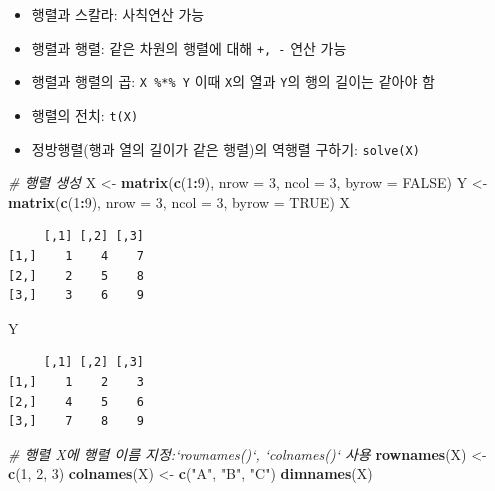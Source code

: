 \documentclass[11pt,a4paper]{book}
\newenvironment{Shaded}{\begin{snugshade}}{\end{snugshade}}
\newcommand{\KeywordTok}[1]{\textcolor[rgb]{0.13,0.29,0.53}{\textbf{#1}}}
\newcommand{\DataTypeTok}[1]{\textcolor[rgb]{0.13,0.29,0.53}{#1}}
\newcommand{\DecValTok}[1]{\textcolor[rgb]{0.00,0.00,0.81}{#1}}
\newcommand{\StringTok}[1]{\textcolor[rgb]{0.31,0.60,0.02}{#1}}
\newcommand{\CommentTok}[1]{\textcolor[rgb]{0.56,0.35,0.01}{\textit{#1}}}
\newcommand{\OtherTok}[1]{\textcolor[rgb]{0.56,0.35,0.01}{#1}}
\newcommand{\OperatorTok}[1]{\textcolor[rgb]{0.81,0.36,0.00}{\textbf{#1}}}
\newcommand{\NormalTok}[1]{#1}
\providecommand{\tightlist}{%
  \setlength{\itemsep}{0pt}\setlength{\parskip}{0pt}}
\theoremstyle{definition}
\theoremstyle{definition}
\theoremstyle{definition}
\theoremstyle{remark}
\begin{document}
\begin{itemize}
  \begin{itemize}
  \tightlist
  \item
    행렬과 스칼라: 사칙연산 가능
  \item
    행렬과 행렬: 같은 차원의 행렬에 대해 \texttt{+,\ -} 연산 가능
  \item
    행렬과 행렬의 곱: \texttt{X\ \%*\%\ Y} 이때 \texttt{X}의 열과
    \texttt{Y}의 행의 길이는 같아야 함
  \item
    행렬의 전치: \texttt{t(X)}
  \item
    정방행렬(행과 열의 길이가 같은 행렬)의 역행렬 구하기:
    \texttt{solve(X)}
  \end{itemize}
\end{itemize}

\footnotesize

\begin{Shaded}
\begin{Highlighting}[]
\CommentTok{# 행렬 생성}
\NormalTok{X <-}\StringTok{ }\KeywordTok{matrix}\NormalTok{(}\KeywordTok{c}\NormalTok{(}\DecValTok{1}\OperatorTok{:}\DecValTok{9}\NormalTok{), }\DataTypeTok{nrow =} \DecValTok{3}\NormalTok{, }\DataTypeTok{ncol =} \DecValTok{3}\NormalTok{, }\DataTypeTok{byrow =} \OtherTok{FALSE}\NormalTok{)}
\NormalTok{Y <-}\StringTok{ }\KeywordTok{matrix}\NormalTok{(}\KeywordTok{c}\NormalTok{(}\DecValTok{1}\OperatorTok{:}\DecValTok{9}\NormalTok{), }\DataTypeTok{nrow =} \DecValTok{3}\NormalTok{, }\DataTypeTok{ncol =} \DecValTok{3}\NormalTok{, }\DataTypeTok{byrow =} \OtherTok{TRUE}\NormalTok{)}
\NormalTok{X}
\end{Highlighting}
\end{Shaded}

\begin{verbatim}
     [,1] [,2] [,3]
[1,]    1    4    7
[2,]    2    5    8
[3,]    3    6    9
\end{verbatim}

\begin{Shaded}
\begin{Highlighting}[]
\NormalTok{Y}
\end{Highlighting}
\end{Shaded}

\begin{verbatim}
     [,1] [,2] [,3]
[1,]    1    2    3
[2,]    4    5    6
[3,]    7    8    9
\end{verbatim}

\begin{Shaded}
\begin{Highlighting}[]
\CommentTok{# 행렬 X에 행렬 이름 지정:`rownames()`, `colnames()` 사용}
\KeywordTok{rownames}\NormalTok{(X) <-}\StringTok{ }\KeywordTok{c}\NormalTok{(}\DecValTok{1}\NormalTok{, }\DecValTok{2}\NormalTok{, }\DecValTok{3}\NormalTok{)}
\KeywordTok{colnames}\NormalTok{(X) <-}\StringTok{ }\KeywordTok{c}\NormalTok{(}\StringTok{"A"}\NormalTok{, }\StringTok{"B"}\NormalTok{, }\StringTok{"C"}\NormalTok{)}
\KeywordTok{dimnames}\NormalTok{(X)}
\end{Highlighting}
\end{Shaded}
\end{document}
